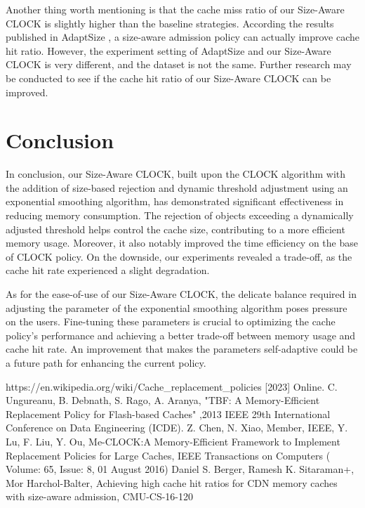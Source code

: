 \documentclass[conference]{IEEEtran}
\begin{document}
Another thing worth mentioning is that the cache miss ratio of our Size-Aware CLOCK is slightly higher than the baseline strategies. According the results published in AdaptSize \cite{b4}, a size-aware admission policy can actually improve cache hit ratio. However, the experiment setting of AdaptSize and our Size-Aware CLOCK is very different, and the dataset is not the same. Further research may be conducted to see if the cache hit ratio of our Size-Aware CLOCK can be improved.

\section{Conclusion}
In conclusion, our Size-Aware CLOCK, built upon the CLOCK algorithm with the addition of size-based rejection and dynamic threshold adjustment using an exponential smoothing algorithm, has demonstrated significant effectiveness in reducing memory consumption. The rejection of objects exceeding a dynamically adjusted threshold helps control the cache size, contributing to a more efficient memory usage. Moreover, it also notably improved the time efficiency on the base of CLOCK policy. On the downside, our experiments revealed a trade-off, as the cache hit rate experienced a slight degradation.

As for the ease-of-use of our Size-Aware CLOCK, the delicate balance required in adjusting the parameter of the exponential smoothing algorithm poses pressure on the users. Fine-tuning these parameters is crucial to optimizing the cache policy's performance and achieving a better trade-off between memory usage and cache hit rate. An improvement that makes the parameters self-adaptive could be a future path for enhancing the current policy.


\begin{thebibliography}{00}
	 https://en.wikipedia.org/wiki/Cache\_replacement\_policies [2023] Online.
	 C. Ungureanu, B. Debnath, S. Rago, A. Aranya, "TBF: A Memory-Efficient Replacement Policy for Flash-based Caches" ,2013 IEEE 29th International Conference on Data Engineering (ICDE). 
	 Z. Chen, N. Xiao, Member, IEEE, Y. Lu, F. Liu, Y. Ou, Me-CLOCK:A Memory-Efficient Framework to Implement Replacement Policies for Large Caches, IEEE Transactions on Computers ( Volume: 65, Issue: 8, 01 August 2016)
	 Daniel S. Berger, Ramesh K. Sitaraman+, Mor Harchol-Balter, Achieving high cache hit ratios for CDN memory caches with size-aware admission, CMU-CS-16-120
\end{thebibliography}
\end{document}
